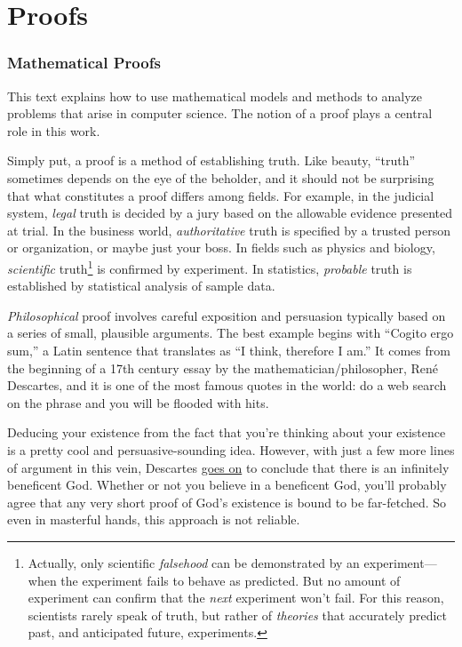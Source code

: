 \part{Proofs}
\label{part:proofs}


\section*{Mathematical Proofs}

This text explains how to use mathematical models and methods to
analyze problems that arise in computer science.  The notion of a
proof plays a central role in this work.

Simply put, a proof is a method of establishing truth.  Like beauty,
``truth'' sometimes depends on the eye of the beholder, and
it should not be surprising that what constitutes a proof differs
among fields.  For example, in the judicial system, \emph{legal} truth
is decided by a jury based on the allowable evidence presented at
trial.  In the business world, \emph{authoritative} truth is specified
by a trusted person or organization, or maybe just your boss.  In
fields such as physics and biology, \emph{scientific}
truth\footnote{Actually, only scientific
\emph{falsehood} can be demonstrated by an experiment---when
the experiment fails to behave as predicted.  But no amount of
experiment can confirm that the \emph{next} experiment won't fail.
For this reason, scientists rarely speak of truth, but rather
of \emph{theories} that accurately predict past, and anticipated
future, experiments.} is confirmed by experiment.  In
statistics, \emph{probable} truth is established by statistical
analysis of sample data.

\emph{Philosophical} proof involves careful exposition and
persuasion typically based on a series of small, plausible arguments.
The best example begins with ``Cogito ergo sum,'' a Latin sentence
that translates as ``I think, therefore I am.''  It comes from the
beginning of a 17th century essay by the mathematician/philosopher,
Ren\'e Descartes, and it is one of the most famous quotes in the
world: do a web search on the phrase and you will be flooded with
hits.

Deducing your existence from the fact that you're thinking about your
existence is a pretty cool and persuasive-sounding idea.
However, with just a few more lines of argument in this vein, Descartes
\href{http://www.btinternet.com/~glynhughes/squashed/descartes.htm}{goes
  on} to conclude that there is an infinitely beneficent God.  Whether
or not you believe in a beneficent God, you'll probably agree that any
very short proof of God's existence is bound to be far-fetched.  So even
in masterful hands, this approach is not reliable.

